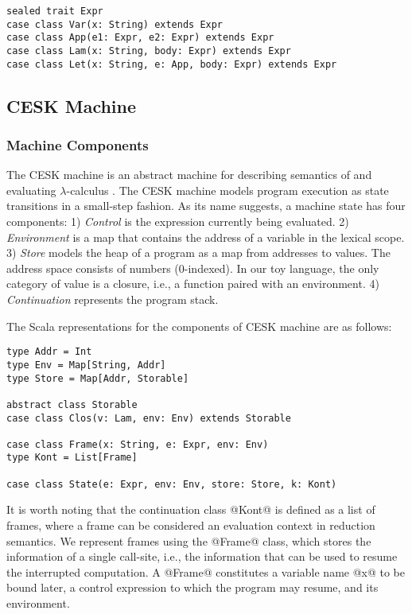 \documentclass[acmsmall,review,anonymous]{acmart}\settopmatter{printfolios=true,printccs=false,printacmref=false}
\begin{document}
\begin{lstlisting}
sealed trait Expr
case class Var(x: String) extends Expr
case class App(e1: Expr, e2: Expr) extends Expr
case class Lam(x: String, body: Expr) extends Expr
case class Let(x: String, e: App, body: Expr) extends Expr
\end{lstlisting}

\subsection{CESK Machine} \label{cesk}

\subsubsection{Machine Components}

The CESK machine is an
abstract machine for describing semantics of and evaluating $\lambda$-calculus \cite{felleisen1987calculus}.
The CESK machine models program execution as state transitions in a small-step fashion.
As its name suggests, a machine state has four components:
1) \textit{Control} is the expression currently being evaluated.
2) \textit{Environment} is a map that contains the address of a variable in the lexical scope.
3) \textit{Store} models the heap of a program as a map from addresses to values.
The address space consists of numbers (0-indexed).
In our toy language, the only category of value is a closure, i.e., a function paired with an environment.
4) \textit{Continuation} represents the program stack. 

The Scala representations for the components of CESK machine are as follows:

\begin{lstlisting}
type Addr = Int
type Env = Map[String, Addr]
type Store = Map[Addr, Storable]

abstract class Storable
case class Clos(v: Lam, env: Env) extends Storable

case class Frame(x: String, e: Expr, env: Env)
type Kont = List[Frame]

case class State(e: Expr, env: Env, store: Store, k: Kont)
\end{lstlisting}

It is worth noting that the continuation class @Kont@ is defined as a list of
frames, where a frame can be considered an evaluation context in reduction semantics.
We represent frames using the @Frame@ class, which stores the information of a single
call-site, i.e., the information that can be used to resume the interrupted computation.
A @Frame@ constitutes a variable name @x@ to be bound later, a control expression
to which the program may resume, and its environment. 
\end{document}
